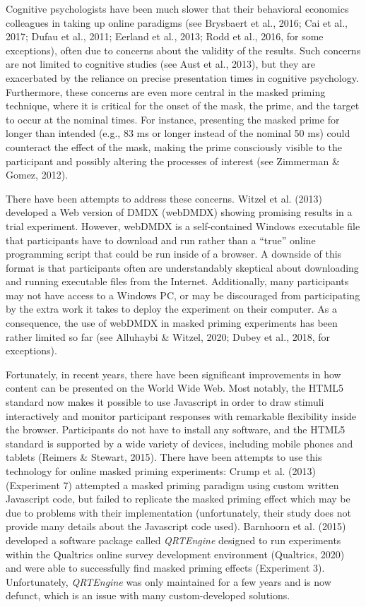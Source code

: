 \documentclass[
  english,
  man,floatsintext]{apa6}
\begin{document}
Cognitive psychologists have been much slower that their behavioral economics colleagues in taking up online paradigms (see Brysbaert et al., 2016; Cai et al., 2017; Dufau et al., 2011; Eerland et al., 2013; Rodd et al., 2016, for some exceptions), often due to concerns about the validity of the results. Such concerns are not limited to cognitive studies (see Aust et al., 2013), but they are exacerbated by the reliance on precise presentation times in cognitive psychology. Furthermore, these concerns are even more central in the masked priming technique, where it is critical for the onset of the mask, the prime, and the target to occur at the nominal times. For instance, presenting the masked prime for longer than intended (e.g., 83 ms or longer instead of the nominal 50 ms) could counteract the effect of the mask, making the prime consciously visible to the participant and possibly altering the processes of interest (see Zimmerman \& Gomez, 2012).

There have been attempts to address these concerns. Witzel et al. (2013) developed a Web version of DMDX (webDMDX) showing promising results in a trial experiment. However, webDMDX is a self-contained Windows executable file that participants have to download and run rather than a ``true'' online programming script that could be run inside of a browser. A downside of this format is that participants often are understandably skeptical about downloading and running executable files from the Internet. Additionally, many participants may not have access to a Windows PC, or may be discouraged from participating by the extra work it takes to deploy the experiment on their computer. As a consequence, the use of webDMDX in masked priming experiments has been rather limited so far (see Alluhaybi \& Witzel, 2020; Dubey et al., 2018, for exceptions).

Fortunately, in recent years, there have been significant improvements in how content can be presented on the World Wide Web. Most notably, the HTML5 standard now makes it possible to use Javascript in order to draw stimuli interactively and monitor participant responses with remarkable flexibility inside the browser. Participants do not have to install any software, and the HTML5 standard is supported by a wide variety of devices, including mobile phones and tablets (Reimers \& Stewart, 2015). There have been attempts to use this technology for online masked priming experiments: Crump et al. (2013) (Experiment 7) attempted a masked priming paradigm using custom written Javascript code, but failed to replicate the masked priming effect which may be due to problems with their implementation (unfortunately, their study does not provide many details about the Javascript code used). Barnhoorn et al. (2015) developed a software package called \emph{QRTEngine} designed to run experiments within the Qualtrics online survey development environment (Qualtrics, 2020) and were able to successfully find masked priming effects (Experiment 3). Unfortunately, \emph{QRTEngine} was only maintained for a few years and is now defunct, which is an issue with many custom-developed solutions.
\end{document}
